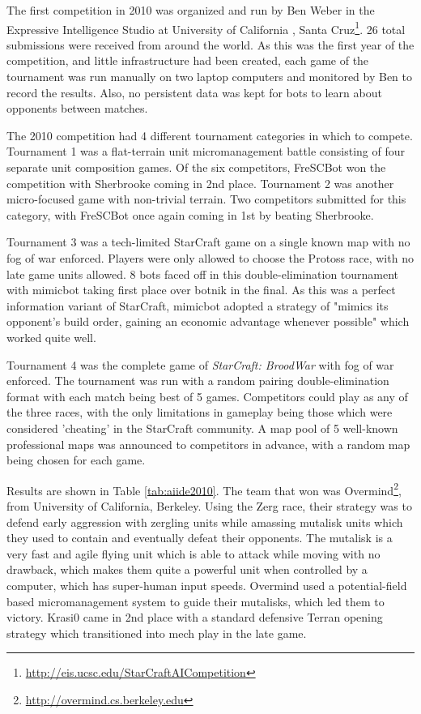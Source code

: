 \documentclass[journal]{IEEEtran}
\begin{document}
The first competition in 2010 was organized and run by Ben Weber in the Expressive
Intelligence Studio at University of California , Santa Cruz\footnote{\url{http://eis.ucsc.edu/StarCraftAICompetition}}. 26 total submissions
were received from around the world. As this was the first year of the competition,
and little infrastructure had been created, each game of the tournament was run 
manually on two laptop computers and monitored by Ben to record the results. Also,
no persistent data was kept for bots to learn about opponents between matches.

The 2010 competition had 4 different tournament categories in which to compete. Tournament 1
was a flat-terrain unit micromanagement battle consisting of four separate unit
composition games. Of the six competitors, FreSCBot won the competition with
Sherbrooke coming in 2nd place. Tournament 2 was another micro-focused game with
non-trivial terrain. Two competitors submitted for this category, with FreSCBot
once again coming in 1st by beating Sherbrooke.

Tournament 3 was a tech-limited StarCraft game on a single known map with no fog of war enforced. Players
were only allowed to choose the Protoss race, with no late game units allowed. 8 bots
faced off in this double-elimination tournament with mimicbot taking first place over botnik in the final.
As this was a perfect information variant of StarCraft, mimicbot adopted a strategy of
"mimics its opponent's build order, gaining an economic advantage whenever possible" which
worked quite well.

Tournament 4 was the complete game of {\em StarCraft: BroodWar} with fog of war enforced. The tournament
was run with a random pairing double-elimination format with each match being best of 5 games.
Competitors could play as any of the three races, with the only limitations in gameplay
being those which were considered 'cheating' in the StarCraft community. A map pool of
5 well-known professional maps was announced to competitors in advance, with a random map being chosen for each game.

Results are shown in Table \ref{tab:aiide2010}. The team that won was Overmind\footnote{\url{http://overmind.cs.berkeley.edu}}, from University of California, Berkeley. Using the Zerg race, their
strategy was to defend early aggression with zergling units while amassing mutalisk units
which they used to contain and eventually defeat their opponents. The mutalisk is a very fast and agile
flying unit which is able to attack while moving with no drawback, which makes them quite a powerful
unit when controlled by a computer, which has super-human input speeds. Overmind used a potential-field
based micromanagement system to guide their mutalisks, which led them to victory. Krasi0 came in 2nd place
with a standard defensive Terran opening strategy which transitioned into mech play in the late game.
\end{document}
